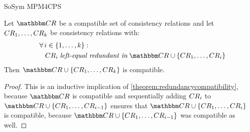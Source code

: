 \begin{copiedFrom}{SoSym MPM4CPS}
    

\begin{corollary} \label{corollary:transitiveredundancycompatibility}
    Let $\consistencyrelationset{CR}$ be a compatible set of consistency relations and let $CR_{1}, \dots, CR_{k}$ be consistency relations with:
    \begin{align*}
        \formulaskip &
        \forall i \in \setted{1, \dots, k} : \\
        & \formulaskip 
        \consistencyrelation{CR}{i} \leftequalredundantinmath \consistencyrelationset{CR} \cup \setted{\consistencyrelation{CR}{1}, \dots, \consistencyrelation{CR}{i}}
    \end{align*}
    Then $\consistencyrelationset{CR} \cup \setted{\consistencyrelation{CR}{1}, \dots, \consistencyrelation{CR}{k}}$ is compatible.
\end{corollary}

\begin{proof}
    This is an inductive implication of \autoref{theorem:redundancycompatibility}, because $\consistencyrelationset{CR}$ is compatible and sequentially adding $CR_{i}$ to $\consistencyrelationset{CR} \cup \setted{\consistencyrelation{CR}{1}, \dots, \consistencyrelation{CR}{i-1}}$ ensures that $\consistencyrelationset{CR} \cup \setted{\consistencyrelation{CR}{1}, \dots, \consistencyrelation{CR}{i}}$ is compatible, because $\consistencyrelationset{CR} \cup \setted{\consistencyrelation{CR}{1}, \dots, \consistencyrelation{CR}{i-1}}$ was compatible as well.
\end{proof}


\end{copiedFrom}
